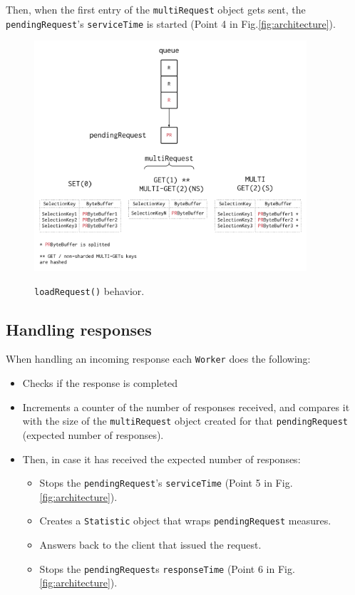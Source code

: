 \documentclass[11pt,a4paper]{article}
\begin{document}
Then, when the first entry of the \texttt{multiRequest} object gets sent, the \texttt{pendingRequest}'s \texttt{serviceTime} is started (Point 4 in Fig.\ref{fig:architecture}).

\begin{figure}[h]
    \centering
    \includegraphics[width=0.9\textwidth]{figures/dequeue.png}
    \label{fig:dequeue}
    \caption{\texttt{loadRequest()} behavior.}
\end{figure}

\subsection{Handling responses}
\label{sec:responses}

When handling an incoming response each \texttt{Worker} does the following:

\begin{itemize}
    \item Checks if the response is completed
    \item Increments a counter of the number of responses received, and compares it with the size of the \texttt{multiRequest} object created for that \texttt{pendingRequest} (expected number of responses).
    \item Then, in case it has received the expected number of responses:
        \begin{itemize}
            \item Stops the \texttt{pendingRequest}'s \texttt{serviceTime} (Point 5 in Fig.\ref{fig:architecture}).
            \item Creates a \texttt{Statistic} object that wraps \texttt{pendingRequest} measures.
            \item Answers back to the client that issued the request.
            \item Stops the \texttt{pendingRequest}s \texttt{responseTime} (Point 6 in Fig.\ref{fig:architecture}).
        \end{itemize}
\end{itemize}        
\end{document}
